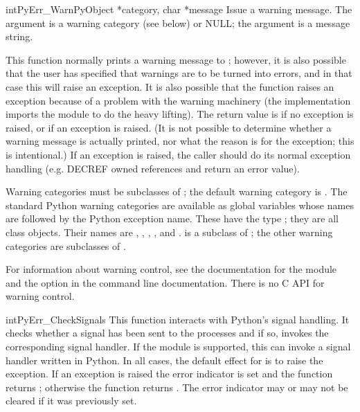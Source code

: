 \documentclass{manual}
\begin{document}
\begin{cfuncdesc}{int}{PyErr_Warn}{PyObject *category, char *message}
Issue a warning message.  The  argument is a warning
category (see below) or NULL; the  argument is a message
string.

This function normally prints a warning message to ;
however, it is also possible that the user has specified that warnings
are to be turned into errors, and in that case this will raise an
exception.  It is also possible that the function raises an exception
because of a problem with the warning machinery (the implementation
imports the  module to do the heavy lifting).  The
return value is  if no exception is raised, or  if
an exception is raised.  (It is not possible to determine whether a
warning message is actually printed, nor what the reason is for the
exception; this is intentional.)  If an exception is raised, the
caller should do its normal exception handling (e.g. DECREF owned
references and return an error value).

Warning categories must be subclasses of ; the default
warning category is .  The standard Python
warning categories are available as global variables whose names are
 followed by the Python exception name.  These have the
type ; they are all class objects.  Their names are
, ,
, , and
.   is a subclass of
; the other warning categories are subclasses
of .

For information about warning control, see the documentation for the
 module and the  option in the command line
documentation.  There is no C API for warning control.
\end{cfuncdesc}

\begin{cfuncdesc}{int}{PyErr_CheckSignals}{}
This function interacts with Python's signal handling.  It checks
whether a signal has been sent to the processes and if so, invokes the
corresponding signal handler.  If the
 module is supported, this can
invoke a signal handler written in Python.  In all cases, the default
effect for  is to raise the
 exception.  If an exception is raised the 
error indicator is set and the function returns ; otherwise
the function returns .  The error indicator may or may not be
cleared if it was previously set.
\end{cfuncdesc}
\end{document}
